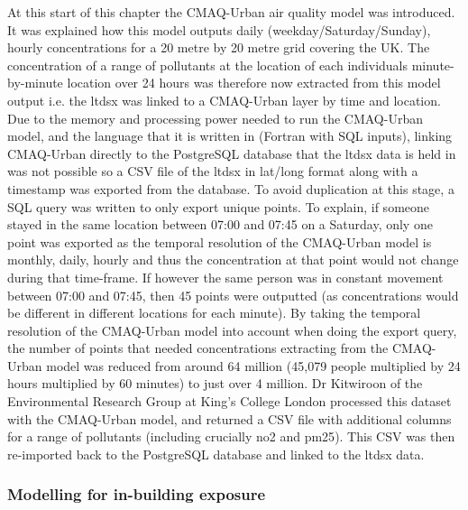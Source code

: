 At this start of this chapter the CMAQ-Urban air quality model was introduced. It was explained how this model outputs daily (weekday/Saturday/Sunday), hourly concentrations for a 20 metre by 20 metre grid covering the UK. The concentration of a range of pollutants at the location of each individuals minute-by-minute location over 24 hours was therefore now extracted from this model output i.e. the \gls{ltdsx} was linked to a CMAQ-Urban layer by time and location. Due to the memory and processing power needed to run the CMAQ-Urban model, and the language that it is written in (Fortran with SQL inputs), linking CMAQ-Urban directly to the PostgreSQL database that the \gls{ltdsx} data is held in was not possible so a CSV file of the \gls{ltdsx} in lat/long format along with a timestamp was exported from the database. To avoid duplication at this stage, a SQL query was written to only export unique points. To explain, if someone stayed in the same location between 07:00 and 07:45 on a Saturday, only one point was exported as the temporal resolution of the CMAQ-Urban model is monthly, daily, hourly and thus the concentration at that point would not change during that time-frame. If however the same person was in constant movement between 07:00 and 07:45, then 45 points were outputted (as concentrations would be different in different locations for each minute). By taking the temporal resolution of the CMAQ-Urban model into account when doing the export query, the number of points that needed concentrations extracting from the CMAQ-Urban model was reduced from around 64 million (45,079 people multiplied by 24 hours multiplied by 60 minutes) to just over 4 million. Dr Kitwiroon of the Environmental Research Group at King's College London processed this dataset with the CMAQ-Urban model, and returned a CSV file with additional columns for a range of pollutants (including crucially \gls{no2} and \gls{pm25}). This CSV was then re-imported back to the PostgreSQL database and linked to the \gls{ltdsx} data.

        \subsubsection{Modelling for in-building exposure}
        \label{sec:modelling_in_building}

